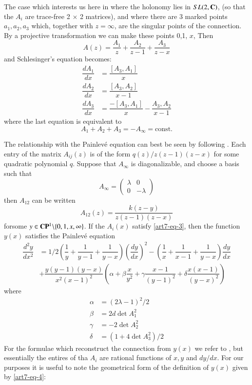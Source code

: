 The case which interests us here in where the holonomy lies in $SL(2,\mathbf{C})$, (so that the $A_{i}$ are trace-free 2 $\times$ 2 matrices), and where there are 3 marked points $a_{1}, a_{2}, a_{3}$ which, together with $z=\infty$, are the singular points of the connection. By a projective transformation we can make these points 0,1, $x$, Then
$$
A(z)= \dfrac{A_{1}}{z} + \dfrac{A_{2}}{z-1} + \dfrac{A_{3}}{z-x}
$$
and Schlesinger's equation becomes:
\begin{align*}\label{art7-eq-3}
\dfrac{dA_{1}}{dx} &= \dfrac{[A_{3}, A_{1}]}{x}\nonumber\\
\dfrac{dA_{2}}{dx} &= \dfrac{[A_{3}, A_{2}]}{x-1}\tag{3}\\
\dfrac{dA_{3}}{dx} &= \dfrac{-[A_{3}, A_{1}]}{x} - \dfrac{A_{3}, A_{2}}{x-1}\nonumber
\end{align*}
where the last equation is equivalent to
$$
A_{1} + A_{2} +A_{3} = -A_{\infty} = \text{const}.
$$

The relationship with the Painlev\'e equation can best be seen by following \cite{art7-key8}. Each entry of the matrix $A_{ij}(z)$ is of the form $q(z)/z(z-1)(z-x)$ for some quadratic polynomial $q$. Suppose that $A_{\infty}$ is diagonalizable, and choose a basis such that
$$
A_{\infty} =
\left(\begin{matrix}
\lambda & 0 \\
0 & -\lambda 
\end{matrix}\right)
$$
then $A_{12}$ can be written
\begin{equation*}\label{art7-eq-4}
A_{12}(z) = \dfrac{k(z-y)}{z(z-1)(z-x)}\tag{4}
\end{equation*}
for\pageoriginale some $y\in\mathbf{C}\mathbf{P}^{1}\backslash \{0,1,x,\infty\}$. If the $A_{i}(x)$ satisfy \eqref{art7-eq-3}, then the function $y(x)$ satisfies the Painlev\'e equation
{\small
\begin{align*}\label{art7-eq-5}
 \dfrac{d^{2}y}{dx^{2}} &= 1/2\left(\dfrac{1}{y} + \dfrac{1}{y-1} + \dfrac{1}{y-x} \right)\left(\dfrac{dy}{dx}\right)^{2}
 -\left( \dfrac{1}{x} + \dfrac{1}{x-1} + \dfrac{1}{y-x}\right)\dfrac{dy}{dx}\nonumber\\
 & +\dfrac{y(y-1)(y-x)}{x^{2}(x-1)^{2}} \left(\alpha + \beta\dfrac{x}{y^{2}} + \gamma\dfrac{x-1}{(y-1)^{2}} + \delta\dfrac{x(x-1)}{(y-x)^{2}} \right)\tag{5}
\end{align*}}\relax
where
\begin{align*}\label{art7-eq-6}
\alpha &= (2\lambda -1)^{2}/2\nonumber\\
\beta &= 2d\det A_{1}^{2}\nonumber\\
\gamma &= -2\det A_{2}^{2}\nonumber\\
\delta &= (1 + 4\det A_{3}^{2})/2\tag{6}
\end{align*} 
For the formulae which reconstruct the connection from $y(x)$ we refer to \cite{art7-key8}, but essentially the entires of tha $A_{i}$ are rational functions of $x, y$ and $dy/dx$. For our purposes it is useful to  note the geometrical form of the definition of $y(x)$ given by \ref{art7-eq-4}:

